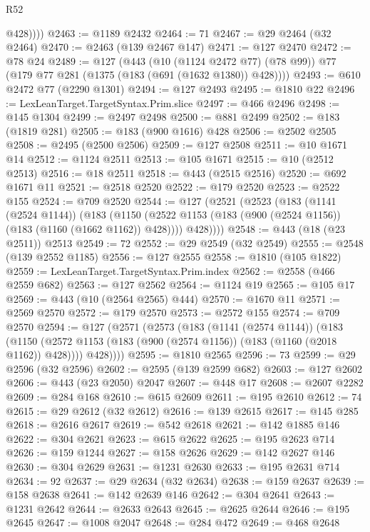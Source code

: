 \begin{lexlean}{R52}
\begin{coremodule}
            @428))))
@2463 := @1189 @2432
@2464 := 71
@2467 := @29 @2464 (@32 @2464)
@2470 := @2463 (@139 @2467 @147)
@2471 := @127 @2470
@2472 := @78 @24
@2489 := @127
    (@443
      (@10 (@1124 @2472 @77) (@78 @99))
      @77
      (@179 @77 @281 (@1375 (@183 (@691 (@1632 @1380)) @428))))
@2493 := @610 @2472 @77 (@2290 @1301)
@2494 := @127 @2493
@2495 := @1810 @22
@2496 := LexLeanTarget.TargetSyntax.Prim.slice
@2497 := @466 @2496
@2498 := @145 @1304
@2499 := @2497 @2498
@2500 := @881 @2499
@2502 := @183 (@1819 @281)
@2505 := @183 (@900 @1616) @428
@2506 := @2502 @2505
@2508 := @2495 (@2500 @2506)
@2509 := @127 @2508
@2511 := @10 @1671 @14
@2512 := @1124 @2511
@2513 := @105 @1671
@2515 := @10 (@2512 @2513)
@2516 := @18 @2511
@2518 := @443 (@2515 @2516)
@2520 := @692 @1671 @11
@2521 := @2518 @2520
@2522 := @179 @2520
@2523 := @2522 @155
@2524 := @709 @2520
@2544 := @127
    (@2521
      (@2523
        (@183
          (@1141 (@2524 @1144))
          (@183
            (@1150 (@2522 @1153 (@183 (@900 (@2524 @1156)) (@183 (@1160 (@1662 @1162)) @428))))
            @428))))
@2548 := @443 (@18 (@23 @2511)) @2513
@2549 := 72
@2552 := @29 @2549 (@32 @2549)
@2555 := @2548 (@139 @2552 @1185)
@2556 := @127 @2555
@2558 := @1810 (@105 @1822)
@2559 := LexLeanTarget.TargetSyntax.Prim.index
@2562 := @2558 (@466 @2559 @682)
@2563 := @127 @2562
@2564 := @1124 @19
@2565 := @105 @17
@2569 := @443 (@10 (@2564 @2565) @444)
@2570 := @1670 @11
@2571 := @2569 @2570
@2572 := @179 @2570
@2573 := @2572 @155
@2574 := @709 @2570
@2594 := @127
    (@2571
      (@2573
        (@183
          (@1141 (@2574 @1144))
          (@183
            (@1150 (@2572 @1153 (@183 (@900 (@2574 @1156)) (@183 (@1160 (@2018 @1162)) @428))))
            @428))))
@2595 := @1810 @2565
@2596 := 73
@2599 := @29 @2596 (@32 @2596)
@2602 := @2595 (@139 @2599 @682)
@2603 := @127 @2602
@2606 := @443 (@23 @2050) @2047
@2607 := @448 @17
@2608 := @2607 @2282
@2609 := @284 @168
@2610 := @615 @2609
@2611 := @195 @2610
@2612 := 74
@2615 := @29 @2612 (@32 @2612)
@2616 := @139 @2615
@2617 := @145 @285
@2618 := @2616 @2617
@2619 := @542 @2618
@2621 := @142 @1885 @146
@2622 := @304 @2621
@2623 := @615 @2622
@2625 := @195 @2623 @714
@2626 := @159 @1244
@2627 := @158 @2626
@2629 := @142 @2627 @146
@2630 := @304 @2629
@2631 := @1231 @2630
@2633 := @195 @2631 @714
@2634 := 92
@2637 := @29 @2634 (@32 @2634)
@2638 := @159 @2637
@2639 := @158 @2638
@2641 := @142 @2639 @146
@2642 := @304 @2641
@2643 := @1231 @2642
@2644 := @2633 @2643
@2645 := @2625 @2644
@2646 := @195 @2645
@2647 := @1008 @2047
@2648 := @284 @472
@2649 := @468 @2648

\end{coremodule}
\end{lexlean}

